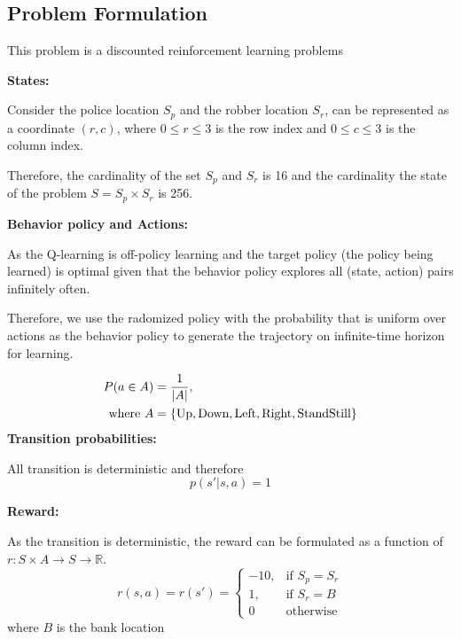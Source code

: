 \documentclass{article}
\begin{document}
\subsection{Problem Formulation}

This problem is a discounted reinforcement learning problems

\textbf{States:}

Consider the police location $S_p$ and the robber location $S_r$, can be represented
as a coordinate $(r, c)$, where $0 \leq r \leq 3$ is the row index and $0 \leq c \leq 3$
is the column index.

Therefore, the cardinality of the set $S_p$ and $S_r$ is 16 and
the cardinality the state of the problem $S = S_p \times S_r$ is 256.

\vspace{0.3cm}

\textbf{Behavior policy and Actions:}

As the Q-learning is off-policy learning and the target policy (the policy being
learned) is optimal given that the behavior policy explores all (state, action) pairs
infinitely often.

Therefore, we use the radomized policy with the probability that is uniform
over actions as the behavior policy to generate the trajectory on infinite-time
horizon for learning.

\begin{align*}
  P(a \in A) &= \frac{1}{|A|}, \\
  \text{where} ~
  A &= \{\textup{Up},\textup{Down},\textup{Left},\textup{Right},\textup{StandStill}\}
\end{align*}
\textbf{Transition probabilities:}

All transition is deterministic and therefore
\begin{equation*}
  p(s' | s, a) = 1
\end{equation*}

\textbf{Reward:}

As the transition is deterministic,
the reward can be formulated as a function of $r: S\times A \rightarrow S \rightarrow \mathbb{R}$.
\begin{equation*}
  r(s, a) = r(s') =
\begin{cases}
    -10 ,& \text{if } S_p = S_r\\
    1,   & \text{if } S_r = B\\
    0    & \text{otherwise}
\end{cases}
\end{equation*}
where $B$ is the bank location
\end{document}

